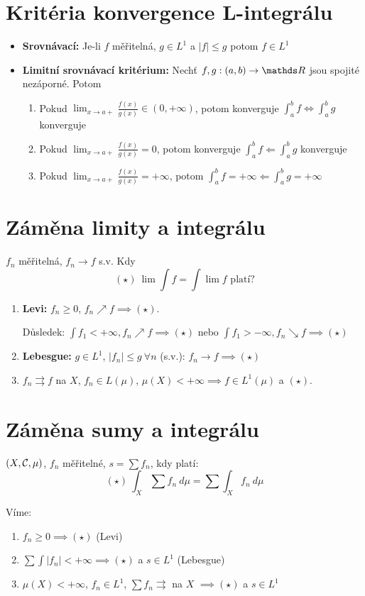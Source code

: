 \documentclass[12pt,a4paper]{article}
\begin{document}
\section{Kritéria konvergence L-integrálu}
\begin{itemize}
	\item {\bf Srovnávací:} Je-li $f$ měřitelná, $g \in L^1$ a $|f| \leq g$ potom $f \in L^1$
	\item {\bf Limitní srovnávací kritérium:} Nechť $f,g : (a,b) \to \R$ jsou spojité nezáporné. Potom
		\begin{enumerate}
			\item Pokud $\lim_{x \to a+} \frac{f(x)}{g(x)} \in (0, +\infty)$, potom konverguje $\int_a^b f \iff \int_a^b g$ konverguje
			\item Pokud $\lim_{x \to a+} \frac{f(x)}{g(x)} = 0$, potom konverguje $\int_a^b f \Leftarrow \int_a^b g$ konverguje
			\item Pokud $\lim_{x \to a+} \frac{f(x)}{g(x)} = +\infty$, potom $\int_a^b f = +\infty \Leftarrow \int_a^b g = +\infty$
		\end{enumerate}
\end{itemize}

\section{Záměna limity a integrálu}
	$f_n$ měřitelná, $f_n \to f$ s.v. Kdy $$(\star)~\lim \int f = \int \lim f \text{ platí?}$$
\begin{enumerate}
	\item {\bf Levi:} $f_n \geq 0$, $f_n \nearrow f \implies (\star)$.

		  Důsledek: $\int f_1 < +\infty, f_n \nearrow f \implies (\star)$ nebo $\int f_1 > -\infty, f_n \searrow f \implies (\star)$
	\item {\bf Lebesgue:} $g \in L^1$, $|f_n| \leq g~\forall n$ (s.v.): $f_n \to f \implies (\star)$
	\item $f_n \rightrightarrows f$ na $X$, $f_n \in L(\mu)$, $\mu(X) < +\infty \implies f \in L^1(\mu)$ a $(\star)$.
\end{enumerate}

\section{Záměna sumy a integrálu}
$(X, \mathcal{ C }, \mu)$, $f_n$ měřitelné, $s = \sum f_n$, kdy platí:
	$$(\star)~\int_X \sum f_n~d\mu = \sum \int_X f_n~d\mu$$

Víme:
\begin{enumerate}
	\item $f_n \geq 0 \implies (\star)$ (Levi)
	\item $\sum \int |f_n| < +\infty \implies (\star)$ a $s \in L^1$ (Lebesgue)
	\item $\mu(X) < +\infty$, $f_n \in L^1$, $\sum f_n \rightrightarrows$ na $X$ $\implies (\star)$ a $s \in L^1$
\end{enumerate}
\end{document}
